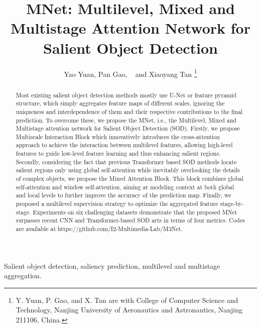 \documentclass[lettersize,journal]{IEEEtran}
\begin{document}
\title{MNet: Multilevel, Mixed and Multistage Attention Network for Salient Object Detection}

\author{Yao Yuan,
        Pan Gao, ~
        and Xiaoyang Tan
\thanks{Y. Yuan, P. Gao, and X. Tan are with College of Computer Science and Technology, Nanjing University of Aeronautics and Astronautics, Nanjing 211106, China.}}




\maketitle

\begin{abstract}
Most existing salient object detection methods mostly use U-Net or feature pyramid structure, which simply aggregates feature maps of different scales, ignoring the uniqueness and interdependence of them and their respective contributions to the final prediction. To overcome these, we propose the MNet, i.e., the Multilevel, Mixed and Multistage attention network for Salient Object Detection (SOD). Firstly, we propose Multiscale Interaction Block which innovatively introduces the cross-attention approach to achieve the interaction between multilevel features, allowing high-level features to guide low-level feature learning and thus enhancing salient regions. Secondly, considering the fact that previous Transformer based SOD methods locate salient regions only using global self-attention while inevitably overlooking the details of complex objects, we propose the Mixed Attention Block. This block combines global self-attention and window self-attention, aiming at modeling context at both global and local levels to further improve the accuracy of the prediction map. Finally, we proposed a multilevel supervision strategy to optimize the aggregated feature stage-by-stage. Experiments on six challenging datasets demonstrate that the proposed MNet surpasses recent CNN and Transformer-based SOD arts in terms of four metrics. Codes are available at https://github.com/I2-Multimedia-Lab/M3Net. 
\end{abstract}

\begin{IEEEkeywords}
	Salient object detection, saliency prediction, multilevel and multistage aggregation. 
\end{IEEEkeywords}
\end{document}
